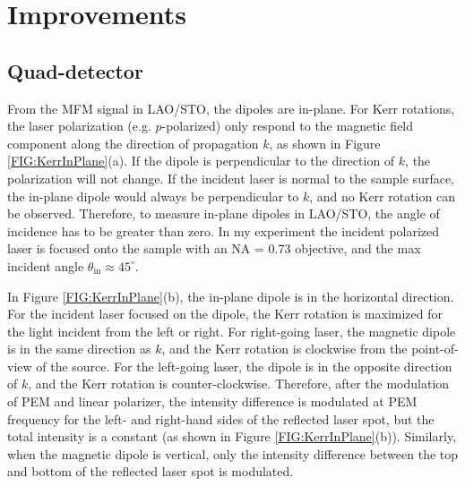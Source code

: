\documentclass[pdflatex, sectionletters, 12pt, final, phd]{pittetd}    %
\begin{document}
\section{Improvements}

\subsection{Quad-detector}

From the MFM signal in LAO/STO, the dipoles are in-plane. For Kerr rotations, the laser polarization (e.g. $p$-polarized) only respond to the magnetic field component along the direction of propagation $k$, as shown in Figure \ref{FIG:KerrInPlane}(a). If the dipole is perpendicular to the direction of $k$, the polarization will not change. If the incident laser is normal to the sample surface, the in-plane dipole would always be perpendicular to $k$, and no Kerr rotation can be observed. Therefore, to measure in-plane dipoles in LAO/STO, the angle of incidence has to be greater than zero. In my experiment the incident polarized laser is focused onto the sample with an NA = 0.73 objective, and the max incident angle $\theta_\mathrm{in} \approx 45^{\circ}$.  

In Figure \ref{FIG:KerrInPlane}(b), the in-plane dipole is in the horizontal direction. For the incident laser focused on the dipole, the Kerr rotation is maximized for the light incident from the left or right. For right-going laser, the magnetic dipole is in the same direction as $k$, and the Kerr rotation is clockwise from the point-of-view of the source. For the left-going laser, the dipole is in the opposite direction of $k$, and the Kerr rotation is counter-clockwise. Therefore, after the modulation of PEM and linear polarizer, the intensity difference is modulated at PEM frequency for the left- and right-hand sides of the reflected laser spot, but the total intensity is a constant (as shown in Figure \ref{FIG:KerrInPlane}(b)). Similarly, when the magnetic dipole is vertical, only the intensity difference between the top and bottom of the reflected laser spot is modulated. 
\end{document}
